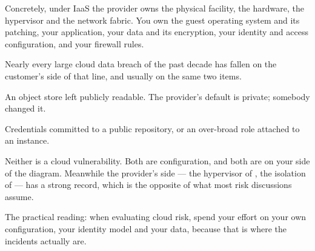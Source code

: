 Concretely, under IaaS the provider owns the physical facility, the hardware,
the hypervisor and the network fabric. You own the guest operating system and
its patching, your application, your data and its encryption, your identity and
access configuration, and your firewall rules.

\begin{conceptbox}
Nearly every large cloud data breach of the past decade has fallen on the
customer's side of that line, and usually on the same two items.

\begin{tight}
  \item An object store left publicly readable. The provider's default is
        private; somebody changed it.
  \item Credentials committed to a public repository, or an over-broad role
        attached to an instance.
\end{tight}

\smallskip
Neither is a cloud vulnerability. Both are configuration, and both are on your
side of the diagram. Meanwhile the provider's side --- the hypervisor of
, the isolation of  --- has a strong record,
which is the opposite of what most risk discussions assume.

\smallskip
The practical reading: when evaluating cloud risk, spend your effort on your
own configuration, your identity model and your data, because that is where the
incidents actually are.
\end{conceptbox}


